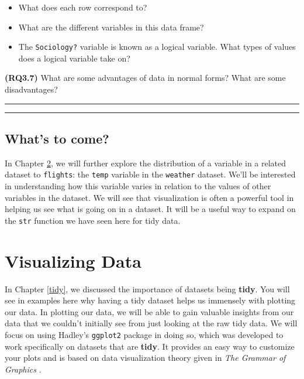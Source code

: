 \documentclass[]{tufte-book}
\providecommand{\tightlist}{%
  \setlength{\itemsep}{0pt}\setlength{\parskip}{0pt}}
\begin{document}
\begin{itemize}
\tightlist
\item
  What does each row correspond to?\\
\item
  What are the different variables in this data frame?\\
\item
  The \texttt{Sociology?} variable is known as a logical variable. What
  types of values does a logical variable take on?
\end{itemize}

\textbf{(RQ3.7)} What are some advantages of data in normal forms? What
are some disadvantages?

\begin{center}\rule{\linewidth}{\linethickness}\end{center}

\begin{center}\rule{\linewidth}{\linethickness}\end{center}

\section{What's to come?}\label{whats-to-come}

In Chapter \ref{viz}, we will further explore the distribution of a
variable in a related dataset to \texttt{flights}: the \texttt{temp}
variable in the \texttt{weather} dataset. We'll be interested in
understanding how this variable varies in relation to the values of
other variables in the dataset. We will see that visualization is often
a powerful tool in helping us see what is going on in a dataset. It will
be a useful way to expand on the \texttt{str} function we have seen here
for tidy data.

\chapter{Visualizing Data}\label{viz}

In Chapter \ref{tidy}, we discussed the importance of datasets being
\textbf{tidy}. You will see in examples here why having a tidy dataset
helps us immensely with plotting our data. In plotting our data, we will
be able to gain valuable insights from our data that we couldn't
initially see from just looking at the raw tidy data. We will focus on
using Hadley's \texttt{ggplot2} package in doing so, which was developed
to work specifically on datasets that are \textbf{tidy}. It provides an
easy way to customize your plots and is based on data visualization
theory given in \emph{The Grammar of Graphics} \citep{wilkinson2005}.
\end{document}
